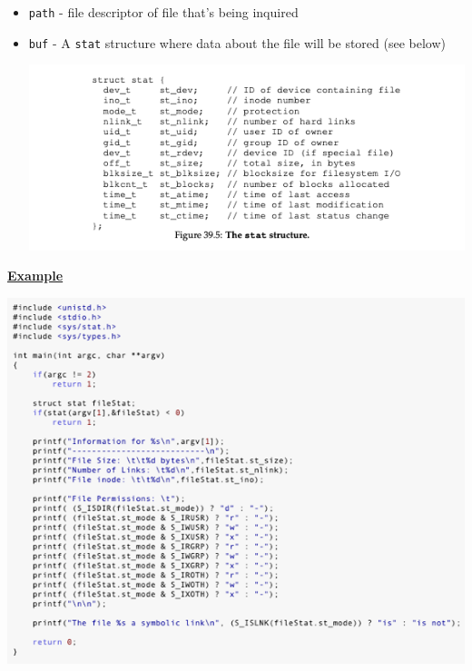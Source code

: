 \documentclass[12pt]{article}
\begin{document}
\begin{enumerate}[1.]
\begin{enumerate}
\begin{itemize}
\begin{itemize}
\begin{itemize}
                    \begin{itemize}
                        \item \texttt{path} - file descriptor of file that's being inquired
                        \item \texttt{buf} - A \texttt{stat} structure where data about the file will be stored (see below)

                        \bigskip

                        \begin{center}
                        \includegraphics[width=\linewidth]{../images/midterm_4_solution_9.png}
                        \end{center}
                    \end{itemize}
                \end{itemize}

                \bigskip

                \underline{\textbf{Example}}

                \begin{center}
                \includegraphics[width=\linewidth]{../images/midterm_4_solution_10.png}
                \end{center}


\end{itemize}
\end{itemize}
\end{enumerate}
\end{enumerate}
\end{document}
